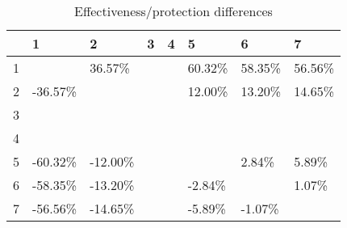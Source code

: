 \begin{table}[ht]
\centering
\begin{tabular}{rlllllll}
  \hline
 & 1 & 2 & 3 & 4 & 5 & 6 & 7 \\ 
  \hline
1 &  & 36.57\% &  &  & 60.32\% & 58.35\% & 56.56\% \\ 
  2 & -36.57\% &  &  &  & 12.00\% & 13.20\% & 14.65\% \\ 
  3 &  &  &  &  &  &  &  \\ 
  4 &  &  &  &  &  &  &  \\ 
  5 & -60.32\% & -12.00\% &  &  &  & 2.84\% & 5.89\% \\ 
  6 & -58.35\% & -13.20\% &  &  & -2.84\% &  & 1.07\% \\ 
  7 & -56.56\% & -14.65\% &  &  & -5.89\% & -1.07\% &  \\ 
   \hline
\end{tabular}
\caption{Effectiveness/protection differences} 
\end{table}
